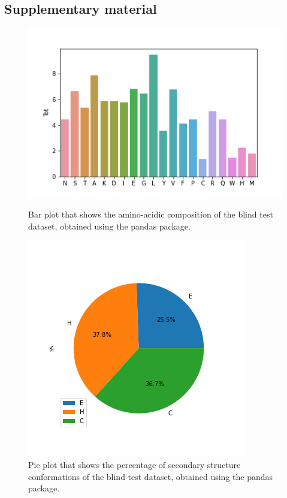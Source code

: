 \documentclass[nocrop]{bioinfo}
\begin{document}
\begin{supplementary}
\section{Supplementary material}
\vspace{-35pt}
\begin{figure}[!h]
    \centering
    \begin{minipage}{0.5\textwidth}
    \includegraphics[scale=0.45]{./plotsJPred4/aa_composition_blind.png}
    \caption{Bar plot that shows the amino-acidic composition of the blind test dataset, obtained using the pandas package.}
    \end{minipage}\hfill
    \begin{minipage}{0.5\textwidth}
    \centering
    \includegraphics[scale=0.45]{./plotsJPred4/ss_composition_blind.png}
    \caption{Pie plot that shows the percentage of secondary structure conformations of the blind test dataset, obtained using the pandas package.}

\end{minipage}
\end{figure}
\end{supplementary}
\end{document}
